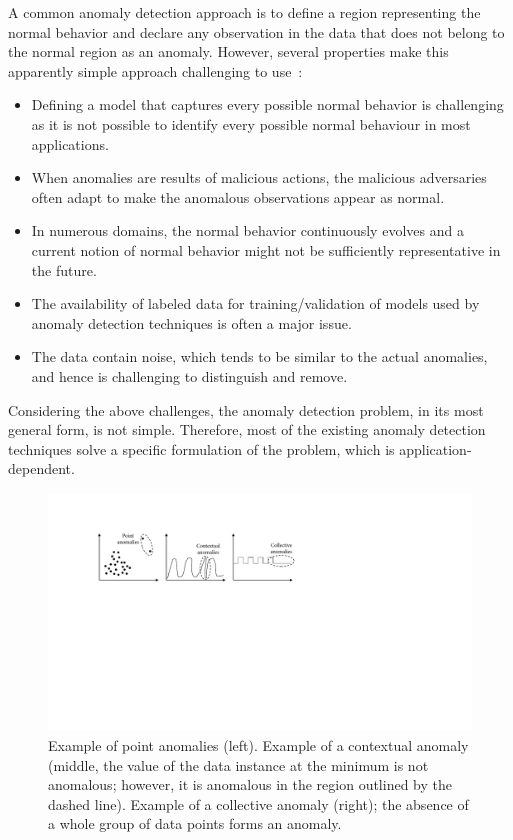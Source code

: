 A common anomaly detection approach is to define a region representing the normal behavior and declare any observation in the data that does not belong to the normal region as an anomaly. However, several properties make this apparently simple approach challenging to use~\cite{chandola2009anomaly,pang2020deep}:
\begin{itemize}
    \item Defining a model that captures every possible normal behavior is challenging as it is not possible to identify every possible normal behaviour in most applications.
    \item When anomalies are results of malicious actions, the malicious adversaries often adapt to make the anomalous observations appear as normal.
    \item In numerous domains, the normal behavior continuously evolves and a current notion of normal behavior might not be sufficiently representative in the future.
    \item The availability of labeled data for training/validation of models used by anomaly detection techniques is often a major issue.
    \item The data contain noise, which tends to be similar to the actual anomalies, and hence is challenging to distinguish and remove.
\end{itemize}

Considering the above challenges, the anomaly detection problem, in its most general form, is not simple. Therefore, most of the existing anomaly detection techniques solve a specific formulation of the problem, which is application-dependent. 

\begin{figure}[!t]
\centerline{\includegraphics[width=1.0\textwidth]{gfx/chap2/typesofanomalies.pdf}}
\caption{Example of point anomalies (left). Example of a contextual anomaly (middle, the value of the data instance at the minimum is not anomalous; however, it is anomalous in the region outlined by the dashed line). Example of a collective anomaly (right); the absence of a whole group of data points forms an anomaly.}
\label{fig:typesofanomalies}
\end{figure}

